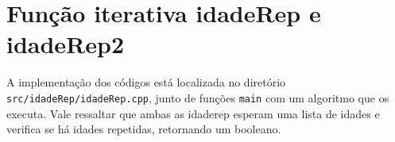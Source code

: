 \section{Função iterativa idadeRep e idadeRep2}
A implementação dos códigos está localizada no diretório \texttt{src/idadeRep/idadeRep.cpp}, junto de funções \texttt{main} com um algoritmo que os executa. Vale ressaltar que ambas as idaderep esperam uma lista de idades e verifica se há idades repetidas, retornando um booleano.


